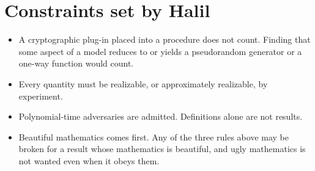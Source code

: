 \section{Constraints set by Halil}
\begin{itemize}[nosep]
\item A cryptographic plug-in placed into a procedure does not count. Finding
  that some aspect of a model reduces to or yields a pseudorandom generator or a
  one-way function would count.
\item Every quantity must be realizable, or approximately realizable, by
  experiment.
\item Polynomial-time adversaries are admitted. Definitions alone are not results.
\item Beautiful mathematics comes first. Any of the three rules above may be broken
  for a result whose mathematics is beautiful, and ugly mathematics is not wanted
  even when it obeys them.
\end{itemize}
